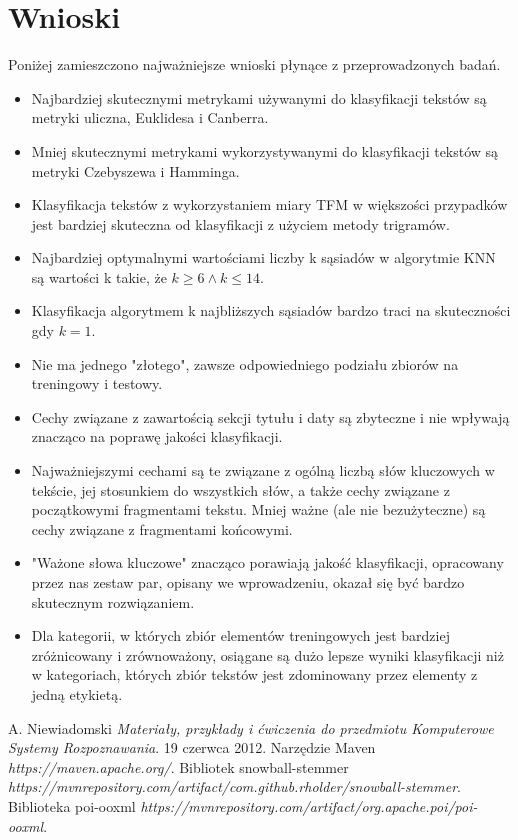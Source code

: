 \documentclass{classrep}
\begin{document}
\section{Wnioski}
Poniżej zamieszczono najważniejsze wnioski płynące z przeprowadzonych badań.
\begin{itemize}[label=$\bullet$\scshape\bfseries]
\item Najbardziej skutecznymi metrykami używanymi do klasyfikacji tekstów są metryki uliczna, Euklidesa i Canberra.
\item Mniej skutecznymi metrykami wykorzystywanymi do klasyfikacji tekstów są metryki Czebyszewa i Hamminga.
\item Klasyfikacja tekstów z wykorzystaniem miary TFM w większości przypadków jest bardziej skuteczna od klasyfikacji z użyciem metody trigramów.
\item Najbardziej optymalnymi wartościami liczby k sąsiadów w algorytmie KNN są wartości k takie, że $k\geq6 \land k\leq14$.
\item Klasyfikacja algorytmem k najbliższych sąsiadów bardzo traci na skuteczności gdy $k=1$.
\item Nie ma jednego "złotego", zawsze odpowiedniego podziału zbiorów na treningowy i testowy.
\item Cechy związane z zawartością sekcji tytułu i daty są zbyteczne i nie wpływają znacząco na poprawę jakości klasyfikacji.
\item Najważniejszymi cechami są te związane z ogólną liczbą słów kluczowych w tekście, jej stosunkiem do wszystkich słów, a także cechy związane z początkowymi fragmentami tekstu. Mniej ważne (ale nie bezużyteczne) są cechy związane z fragmentami końcowymi.
\item "Ważone słowa kluczowe" znacząco porawiają jakość klasyfikacji, opracowany przez nas zestaw par, opisany we wprowadzeniu, okazał się być bardzo skutecznym rozwiązaniem.
\item Dla kategorii, w których zbiór elementów treningowych jest bardziej zróżnicowany i zrównoważony, osiągane są dużo lepsze wyniki klasyfikacji niż w kategoriach, których zbiór tekstów jest zdominowany przez elementy z jedną etykietą.
\end{itemize}

\begin{thebibliography}{4}
A. Niewiadomski
\textit{Materiały, przykłady i ćwiczenia do przedmiotu Komputerowe Systemy Rozpoznawania}. 
19 czerwca 2012.
Narzędzie Maven\newline
\textit{https://maven.apache.org/}. 
Bibliotek snowball-stemmer\newline
\textit{https://mvnrepository.com/artifact/com.github.rholder/snowball-stemmer}. 
Biblioteka poi-ooxml\newline
\textit{https://mvnrepository.com/artifact/org.apache.poi/poi-ooxml}. 
\end{thebibliography}
\end{document}
